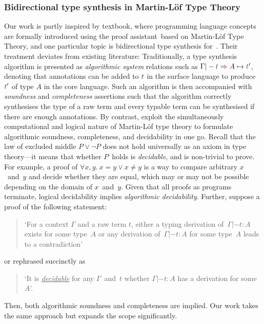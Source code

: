 \subsubsection{Bidirectional type synthesis in Martin-L\"of Type Theory}
\label{sec:PLFA}

Our work is partly inspired by  textbook, where programming language concepts are formally introduced using the proof assistant~\Agda based on Martin-L\"of Type Theory, and one particular topic is bidirectional type synthesis for~\PCF.
Their treatment deviates from existing literature:
Traditionally, a type synthesis algorithm is presented as \emph{algorithmic system} relations such as $\Gamma |- \isTerm{t} \syn A \mapsto \isTerm{t}'$, denoting that annotations can be added to $\isTerm{t}$ in the surface language to produce $\isTerm{t}'$ of type $A$ in the core language.
Such an algorithm is then accompanied with \emph{soundness} and \emph{completeness} assertions such that the algorithm correctly synthesises the type of a raw term and every typable term can be synthesised if there are enough annotations.
By contrast, \citeauthor{Wadler2022} exploit the simultaneously computational and logical nature of Martin-L\"of type theory to formulate algorithmic soundness, completeness, and decidability in one go.
Recall that the law of excluded middle $P \vee \neg P$ does not hold universally as an axiom in type theory---it means that whether $P$~holds is \emph{decidable}, and is non-trivial to prove.
For example, a proof of $\forall x, y.~x = y \mathrel\vee x \neq y$ is a way to compare arbitrary $x$~and~$y$ and decide whether they are equal, which may or may not be possible depending on the domain of $x$~and~$y$.
Given that all proofs as programs terminate, logical decidability implies \emph{algorithmic decidability}.
Further, suppose a proof of the following statement:
\begin{quote}
  `For a context $\Gamma$ and a raw term $t$, either a typing derivation of\, $\Gamma |- t : A$ exists for some type~$A$ or any derivation of\, $\Gamma |- t : A$ for some type~$A$ leads to a contradiction'
\end{quote}
or rephrased succinctly as 
\begin{quote}
  `It is \underline{\emph{decidable}} for any $\Gamma$~and~$t$ whether $\Gamma |- t : A$ has a derivation for some~$A$'.
\end{quote}
Then, both algorithmic soundness and completeness are implied.
Our work takes the same approach but expands the scope significantly.

